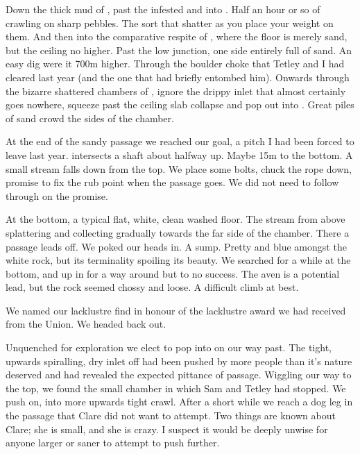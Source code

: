 Down the thick mud of , past the infested  and into . Half an hour or so of crawling on sharp pebbles. The sort that shatter as you place your weight on them. And then into the comparative respite of , where the floor is merely sand, but the ceiling no higher. Past the low junction, one side entirely full of sand. An easy dig were it 700m higher. Through the boulder choke that Tetley and I had cleared last year (and the one that had briefly entombed him). Onwards through the bizarre shattered chambers of , ignore the drippy inlet that almost certainly goes nowhere, squeeze past the ceiling slab collapse and pop out into . Great piles of sand crowd the sides of the chamber.

At the end of the sandy passage we reached our goal, a pitch I had been forced to leave last year.  intersects a shaft about halfway up. Maybe 15m to the bottom. A small stream falls down from the top. We place some bolts, chuck the rope down, promise to fix the rub point when the passage goes. We did not need to follow through on the promise. 

At the bottom, a typical flat, white, clean washed floor. The stream from above splattering and collecting gradually towards the far side of the chamber. There a passage leads off. We poked our heads in. A sump. Pretty and blue amongst the white rock, but its terminality spoiling its beauty. We searched for a while at the bottom, and up in  for a way around but to no success. The aven is a potential lead, but the rock seemed chossy and loose. A difficult climb at best.

We named our lacklustre find  in honour of the lacklustre award we had received from the Union. We headed back out. 

Unquenched for exploration we elect to pop into  on our way past. The tight, upwards spiralling, dry inlet off  had been pushed by more people than it's nature deserved and had revealed the expected pittance of passage. Wiggling our way to the top, we found the small chamber in which Sam and Tetley had stopped. We push on, into more upwards tight crawl. After a short while we reach a dog leg in the passage that Clare did not want to attempt. Two things are known about Clare; she is small, and she is crazy. I suspect it would be deeply unwise for anyone larger or saner to attempt to push further. 

